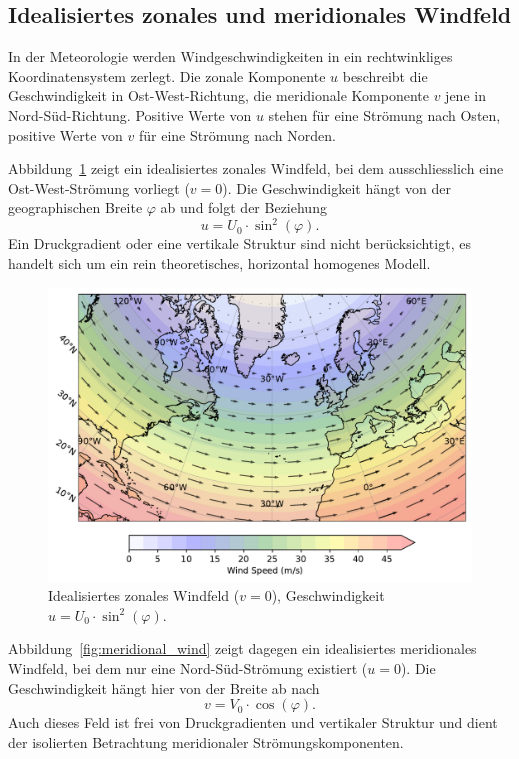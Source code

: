 
\subsection{Idealisiertes zonales und meridionales Windfeld}

In der Meteorologie werden Windgeschwindigkeiten in ein rechtwinkliges Koordinatensystem zerlegt. 
Die {zonal}e Komponente \(u\) beschreibt die Geschwindigkeit in Ost-West-Richtung, 
die {meridional}e Komponente \(v\) jene in Nord-Süd-Richtung. 
Positive Werte von \(u\) stehen für eine Strömung nach Osten, positive Werte von \(v\) für eine Strömung nach Norden.


Abbildung~\ref{fig:zonal_wind} zeigt ein idealisiertes zonales Windfeld, bei
dem ausschliesslich eine Ost-West-Strömung vorliegt (\(v = 0\)). Die
Geschwindigkeit hängt von der geographischen Breite \(\varphi\) ab und folgt der
Beziehung
\begin{equation}
	u = U_0 \cdot \sin^2(\varphi).
	\label{rossby:eq:zonal_wind}
\end{equation}
Ein Druckgradient oder eine vertikale Struktur sind nicht berücksichtigt, es handelt sich um ein rein theoretisches, horizontal homogenes Modell.

\begin{figure}
	\centering
	\includegraphics[width=\textwidth, trim=1cm 0cm 2cm 0cm, clip]{papers/rossby/images/zonal_wind_plot.pdf}
	\caption{Idealisiertes zonales Windfeld (\(v=0\)), Geschwindigkeit \(u = U_0 \cdot \sin^2(\varphi)\).}
	\label{fig:zonal_wind}
\end{figure}

\noindent
Abbildung~\ref{fig:meridional_wind} zeigt dagegen ein idealisiertes meridionales Windfeld, bei dem nur eine Nord-Süd-Strömung existiert (\(u = 0\)).
Die Geschwindigkeit hängt hier von der Breite ab nach
\begin{equation}
	v = V_0 \cdot \cos(\varphi).
	\label{rossby:eq:meridional_wind}
\end{equation}
Auch dieses Feld ist frei von Druckgradienten und vertikaler Struktur und dient der isolierten Betrachtung meridionaler Strömungskomponenten.

